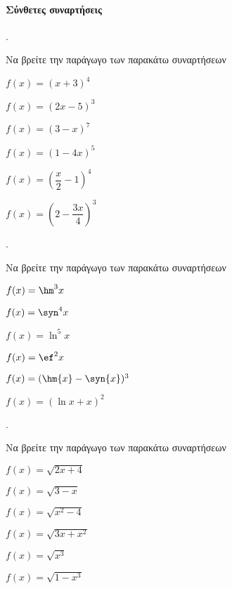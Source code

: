 \documentclass[11pt,a4paper,twocolumn]{article}
\newcounter{askhsh}
\newcommand{\askhsh}{{\large\theaskhsh.}\ \addtocounter{askhsh}{1}}
\begin{document}
\paragraph{Σύνθετες συναρτήσεις}
\askhsh Να βρείτε την παράγωγο των παρακάτω συναρτήσεων
\begin{multicols}{2}
\begin{alist}
\item $ f(x)=(x+3)^4 $
\item $ f(x)=(2x-5)^3 $
\item $ f(x)=(3-x)^7 $
\item $ f(x)=(1-4x)^5 $
\item $ f(x)=\left(\dfrac{x}{2}-1\right)^4 $
\item $ f(x)=\left(2-\dfrac{3x}{4}\right)^3 $
\end{alist}
\end{multicols}
\askhsh Να βρείτε την παράγωγο των παρακάτω συναρτήσεων
\begin{alist}
\item $ f(x)=\hm^3{x} $
\item $ f(x)=\syn^4{x} $
\item $ f(x)=\ln^5{x} $
\item $ f(x)=\ef^2{x} $
\item $ f(x)=(\hm{x}-\syn{x})^3 $
\item $ f(x)=(\ln{x}+x)^2 $
\end{alist}
\askhsh Να βρείτε την παράγωγο των παρακάτω συναρτήσεων
\begin{multicols}{2}
\begin{alist}
\item $ f(x)=\sqrt{2x+4} $
\item $ f(x)=\sqrt{3-x} $
\item $ f(x)=\sqrt{x^2-4} $
\item $ f(x)=\sqrt{3x+x^2} $
\item $ f(x)=\sqrt{x^3} $
\item $ f(x)=\sqrt{1-x^3} $
\end{alist}
\end{multicols}
\end{document}

